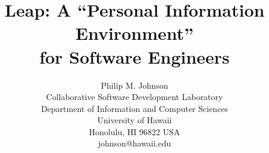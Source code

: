 




\title{Leap: A ``Personal Information Environment'' \\ for Software Engineers}

\author{
        \parbox{4.3in} 
        {\begin{center}
        {\authornamefont Philip M. Johnson}\\ 
        Collaborative Software Development Laboratory\\
        Department of Information and Computer Sciences\\
        University of Hawaii\\
        Honolulu, HI 96822 USA \\
        johnson@hawaii.edu
        \end{center} }
}



\maketitle
\copyrightspace
%
%



\thispagestyle{empty}  %


